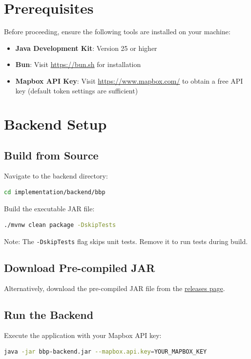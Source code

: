 \section{Prerequisites}
Before proceeding, ensure the following tools are installed on your machine:
\begin{itemize}
    \item \textbf{Java Development Kit}: Version 25 or higher
    \item \textbf{Bun}: Visit \url{https://bun.sh} for installation
    \item \textbf{Mapbox API Key}: Visit \url{https://www.mapbox.com/} to obtain a free API key (default token settings are sufficient)
\end{itemize}

\section{Backend Setup}

\subsection{Build from Source}
Navigate to the backend directory:
\begin{lstlisting}[language=bash]
cd implementation/backend/bbp
\end{lstlisting}

\noindent Build the executable JAR file:
\begin{lstlisting}[language=bash]
./mvnw clean package -DskipTests
\end{lstlisting}
\noindent Note: The \texttt{-DskipTests} flag skips unit tests. Remove it to run tests during build.

\subsection{Download Pre-compiled JAR}
Alternatively, download the pre-compiled JAR file from the \href{https://github.com/m-tteo/sw-eng-2-raimondi-sala/releases/tag/BestBikePaths-v1.0.0}{releases page}.

\subsection{Run the Backend}
Execute the application with your Mapbox API key:
\begin{lstlisting}[language=bash]
java -jar bbp-backend.jar --mapbox.api.key=YOUR_MAPBOX_KEY
\end{lstlisting}

